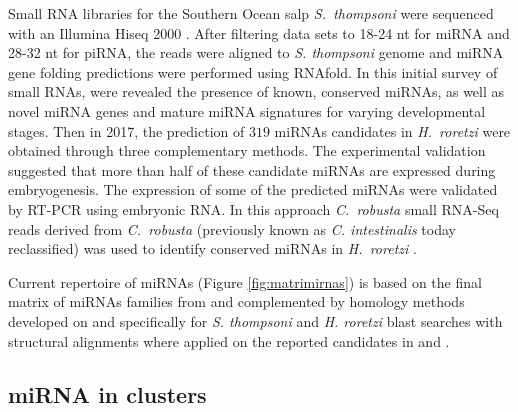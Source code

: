 \documentclass[graybox]{svmult}
\newcommand{\TODO}[1]{\begingroup\color{red}#1\endgroup}
\begin{document}
Small RNA libraries for the Southern Ocean salp \textit{S.\ thompsoni} 
were sequenced with an Illumina Hiseq 2000 \cite{Jue2016}. After filtering data
sets to 18-24 nt for miRNA and 28-32 nt for piRNA, the reads were aligned
to \textit{S. thompsoni} genome and miRNA gene folding predictions were
performed using RNAfold. In this initial survey of small RNAs, were
revealed the presence of known, conserved miRNAs, as well as novel miRNA
genes and mature miRNA signatures for varying developmental stages. Then in
2017, the prediction of $319$ miRNAs candidates in \textit{H.\ roretzi}
were obtained through three complementary methods. The experimental
validation suggested that more than half of these candidate miRNAs are
expressed during embryogenesis. The expression of some of the predicted
miRNAs were validated by RT-PCR using embryonic RNA. In this approach
\textit{C.\ robusta} small RNA-Seq reads derived from \textit{C.\ robusta}
\cite{Shi2009} (previously known as \textit{C. intestinalis} today
reclassified) was used to identify conserved miRNAs in \textit{H.\ roretzi}
\cite{Wang2017}.

Current repertoire of miRNAs (Figure \ref{fig:matrimirnas}) is based on the
final matrix of miRNAs families from \cite{Hertel:15a} and complemented by
homology methods developed on \cite{Velandia-Huerto2016} and specifically for
\textit{S. thompsoni} and \textit{H. roretzi} blast searches with
structural alignments where applied on the reported candidates in
\cite{Jue2016} and \cite{Wang2017}.


\subsection{miRNA in clusters}
\end{document}
